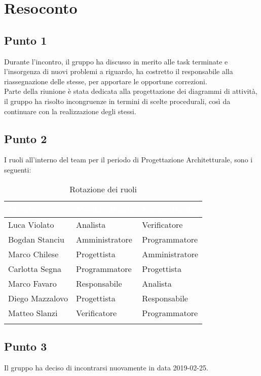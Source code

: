 \section{Resoconto}

\subsection{Punto 1} 
Durante l'incontro, il gruppo ha discusso in merito alle task terminate e l'insorgenza di nuovi problemi a riguardo, ha costretto il responsabile alla riassegnazione delle stesse, per apportare le opportune correzioni. \-\\
Parte della riunione è stata dedicata alla progettazione dei diagrammi di attività, il gruppo ha risolto incongruenze in termini di scelte procedurali, così da continuare con la realizzazione degli stessi.


\subsection{Punto 2}
I ruoli all'interno del team per il periodo di Progettazione Architetturale, sono i seguenti:

\begin{center}
\begin{longtable}[c]{|m{}|m{}|m{}|} 
\hline
\rowcolor{bluelogo}\textbf{\textcolor{white}{Membro}} & \textbf{\textcolor{white}{Vecchio Ruolo}} & \textbf{\textcolor{white}{Nuovo Ruolo}}\\
\hline
\hline
Luca Violato & Analista & Verificatore\\
\hline
\rowcolor{grigio}Bogdan Stanciu & Amministratore & Programmatore\\
\hline
Marco Chilese & Progettista & Amministratore\\
\hline
\rowcolor{grigio}Carlotta Segna & Programmatore & Progettista\\
\hline
Marco Favaro & Responsabile & Analista\\
\hline
\rowcolor{grigio} Diego Mazzalovo & Progettista & Responsabile\\
\hline
Matteo Slanzi & Verificatore & Programmatore\\
\hline
\caption{Rotazione dei ruoli}
\end{longtable}
\end{center}

\subsection{Punto 3}
Il gruppo ha deciso di incontrarsi nuovamente in data 2019-02-25.
